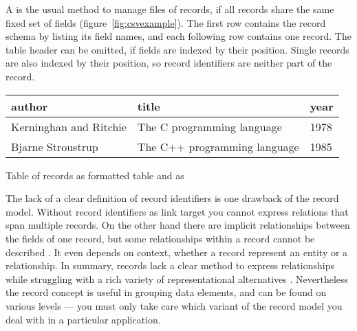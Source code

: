 A  is the usual method to manage files of records, if
all records share the same fixed set of fields (figure~\ref{fig:csvexample}).
The first row contains the record schema by listing its field names, and each
following row contains one record. The table header can be omitted, if fields
are indexed by their position. Single records are also indexed by their
position, so record identifiers are neither part of the record.

\begin{example}
\centering
\begin{tabular}{|l|l|l|}
\hline
\textbf{author} & \textbf{title} & \textbf{year} \\
\hline
Kerninghan and Ritchie & The C programming language & 1978 \\
\hline
Bjarne Stroustrup & The C++ programming language & 1985 \\
\hline
\end{tabular}


\caption{Table of records as formatted table and as }
\label{fig:csvexample}
\end{example}


The lack of a clear definition of record identifiers is one drawback of the
record model. Without record identifiers as link target you cannot express
relations that span multiple records. On the other hand there are implicit
relationships between the fields of one record, but some relationships within
a record cannot be described \cite[ch. 8.4f]{Kent1978}. It even depends on
context, whether a record represent an entity or a relationship. In summary,
records lack a clear method to express relationships while struggling with a 
rich variety of representational alternatives \cite{Kent1988}. Nevertheless 
the record concept is useful in grouping data elements, and can be found on
various levels --- you must only take care which variant of the record model
you deal with in a particular application.

